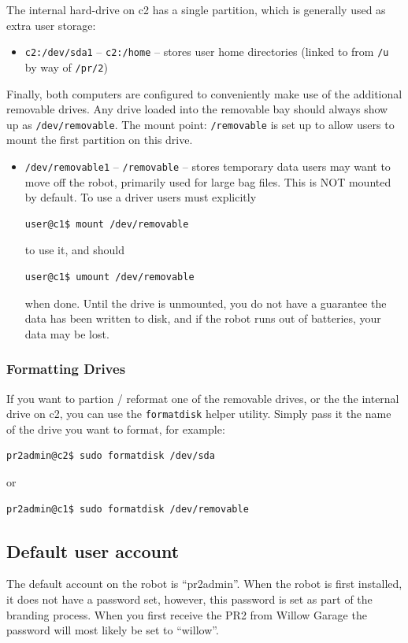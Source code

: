 The internal hard-drive on c2 has a single partition, which is
generally used as extra user storage:
\begin{itemize}
\item \texttt{c2:/dev/sda1} -- \texttt{c2:/home} -- stores user home
  directories (linked to from \texttt{/u} by way of \texttt{/pr/2})
\end{itemize}

Finally, both computers are configured to conveniently make use of the
additional removable drives.  Any drive loaded into the removable bay
should always show up as \texttt{/dev/removable}.  The mount point:
\texttt{/removable} is set up to allow users to mount the first
partition on this drive.
\begin{itemize}
\item \texttt{/dev/removable1} -- \texttt{/removable} -- stores
  temporary data users may want to move off the robot, primarily used
  for large bag files.  This is NOT mounted by default.  To use a
  driver users must explicitly
\begin{verbatim}
user@c1$ mount /dev/removable
\end{verbatim}
to use it, and should 
\begin{verbatim}
user@c1$ umount /dev/removable
\end{verbatim}
when done.  Until the drive is unmounted, you do not have a guarantee
the data has been written to disk, and if the robot runs out of
batteries, your data may be lost.
\end{itemize}

\subsubsection{Formatting Drives}
If you want to partion / reformat one of the removable drives, or the
the internal drive on c2, you can use the \texttt{formatdisk} helper
utility.  Simply pass it the name of the drive you want to format, for
example:
\begin{verbatim}
pr2admin@c2$ sudo formatdisk /dev/sda
\end{verbatim}
or
\begin{verbatim}
pr2admin@c1$ sudo formatdisk /dev/removable
\end{verbatim}

\subsection{Default user account}
The default account on the robot is ``pr2admin''.  When the robot is
first installed, it does not have a password set, however, this
password is set as part of the branding process.  When you first
receive the PR2 from Willow Garage the password will most likely be
set to ``willow''.

